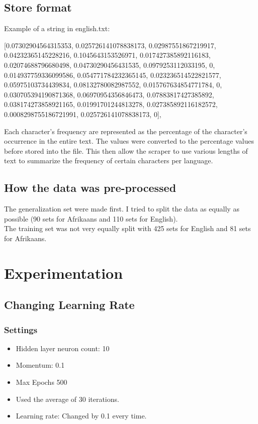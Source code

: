 \documentclass[pdftex,10pt,a4paper]{report}
\begin{document}
\section{Store format}
Example of a string in english.txt:
	\begin{center}
[0.07302904564315353, 0.025726141078838173, 0.02987551867219917, 0.04232365145228216, 0.1045643153526971, 0.017427385892116183, 0.02074688796680498, 0.04730290456431535, 0.0979253112033195, 0, 0.014937759336099586, 0.054771784232365145, 0.023236514522821577, 0.05975103734439834, 0.08132780082987552, 0.015767634854771784, 0, 0.030705394190871368, 0.06970954356846473, 0.07883817427385892, 0.038174273858921165, 0.01991701244813278, 0.027385892116182572, 0.0008298755186721991, 0.025726141078838173, 0],
	\end{center}

Each character's frequency are represented as the percentage of the character's occurrence in the entire text. The values were converted to the percentage values before stored into the file. This then allow the scraper to use various lengths of text to summarize the frequency of certain characters per language. 

\section{How the data was pre-processed}

The generalization set were made first. I tried to split the data as equally as possible (90 sets for Afrikaans and 110 sets for English). \\
The training set was not very equally split with 425 sets for English and 81 sets for Afrikaans.
				
\chapter{Experimentation}
\section{Changing Learning Rate}
\subsection{Settings}
\begin{itemize}
	\item Hidden layer neuron count: 10
	\item Momentum: 0.1
	\item Max Epochs 500
	\item Used the average of 30 iterations. 
	\item Learning rate: Changed by 0.1 every time.  
\end{itemize}
\end{document}
